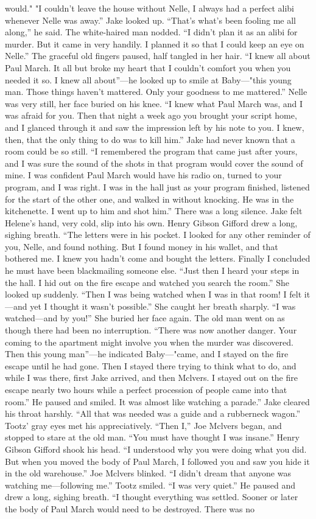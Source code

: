 \documentclass{novel}
\begin{document}
would." "I couldn't leave the house without Nelle, I always had a perfect alibi whenever Nelle was away.” Jake looked up. “That’s what’s been fooling me all along,” he said. The white-haired man nodded. “I didn’t plan it as an alibi for murder. But it came in very handily. I planned it so that I could keep an eye on Nelle.” The graceful old fingers paused, half tangled in her hair. “I knew all about Paul March. It all but broke my heart that I couldn’t comfort you when you needed it so. I knew all about”—he looked up to smile at Baby—"this young man. Those things haven’t mattered. Only your goodness to me mattered.” Nelle was very still, her face buried on his knee. “I knew what Paul March was, and I was afraid for you. Then that night a week ago you brought your script home, and I glanced through it and saw the impression left by his note to you. I knew, then, that the only thing to do was to kill him.” Jake had never known that a room could be so still. “I remembered the program that came just after yours, and I was sure the sound of the shots in that program would cover the sound of mine. I was confident Paul March would have his radio on, turned to your program, and I was right. I was in the hall just as your program finished, listened for the start of the other one, and walked in without knocking. He was in the kitchenette. I went up to him and shot him.” There was a long silence. Jake felt Helene’s hand, very cold, slip into his own. Henry Gibson Gifford drew a long, sighing breath. “The letters were in his pocket. I looked for any other reminder of you, Nelle, and found nothing. But I found money in his wallet, and that bothered me. I knew you hadn’t come and bought the letters. Finally I concluded he must have been blackmailing someone else. “Just then I heard your steps in the hall. I hid out on the fire escape and watched you search the room.” She looked up suddenly. “Then I was being watched when I was in that room! I felt it—and yet I thought it wasn’t possible.” She caught her breath sharply. “I was watched—and by you!” She buried her face again. The old man went on as though there had been no interruption. “There was now another danger. Your coming to the apartment might involve you when the murder was discovered. Then this young man”—he indicated Baby—"came, and I stayed on the fire escape until he had gone. Then I stayed there trying to think what to do, and while I was there, first Jake arrived, and then Mclvers. I stayed out on the fire escape nearly two hours while a perfect procession of people came into that room.” He paused and smiled. It was almost like watching a parade.” Jake cleared his throat harshly. “All that was needed was a guide and a rubberneck wagon.” Tootz’ gray eyes met his appreciatively. “Then I,” Joe Mclvers began, and stopped to stare at the old man. “You must have thought I was insane.” Henry Gibson Gifford shook his head. “I understood why you were doing what you did. But when you moved the body of Paul March, I followed you and saw you hide it in the old warehouse.” Joe Mclvers blinked. “I didn’t dream that anyone was watching me—following me.” Tootz smiled. “I was very quiet.” He paused and drew a long, sighing breath. “I thought everything was settled. Sooner or later the body of Paul March would need to be destroyed. There was no 
\end{document}
